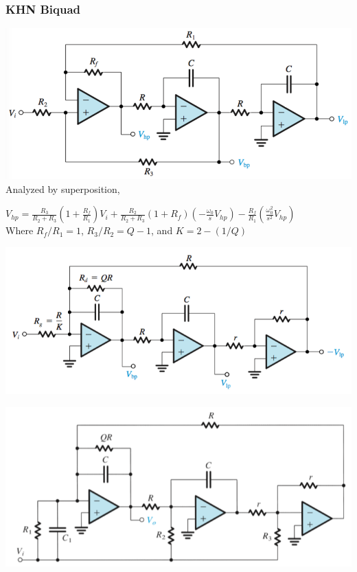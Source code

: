 \documentclass[11pt]{article}
\begin{document}
    \subsubsection{KHN Biquad}

    \includegraphics[width=\textwidth]{khn}
    Analyzed by superposition, 
 
    $V_{hp} = \frac{R_3}{R_2+R_3}(1+ \frac{R_f}{R_1})V_i + \frac{R_2}{R_2 + R_3}(1 + R_f)(-\frac{\omega_0}{s} V_{hp}) - \frac{R_f}{R_1}(\frac{\omega_{0}^2}{s^2} V_{hp})$  \\

    Where $R_f/R_1 = 1$, $R_3/R_2 = Q - 1$, and $K = 2 - (1/Q)$
    
    \includegraphics[width=\textwidth]{tow}

    \includegraphics[width=\textwidth]{tow-feed} 
\end{document}

